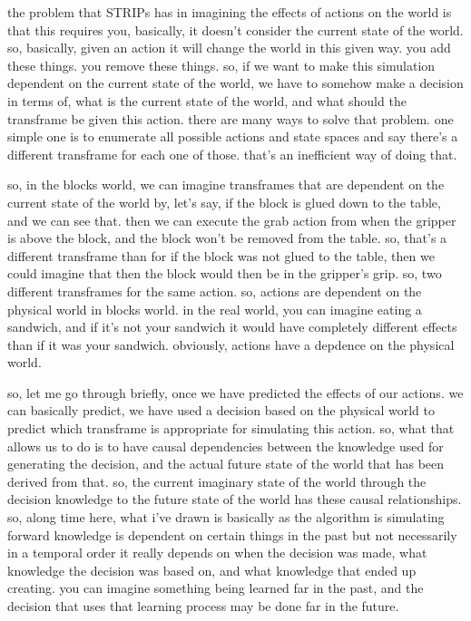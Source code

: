 the problem that STRIPs has in imagining the effects of actions on the world is that this requires you, basically, it doesn't consider the current state of the world.
so, basically, given an action it will change the world in this given way.
you add these things.
you remove these things.
so, if we want to make this simulation dependent on the current state of the world, we have to somehow make a decision in terms of, what is the current state of the world, and what should the transframe be given this action.
there are many ways to solve that problem.
one simple one is to enumerate all possible actions and state spaces and say there's a different transframe for each one of those.
that's an inefficient way of doing that.

so, in the blocks world, we can imagine transframes that are dependent on the current state of the world by,
let's say, if the block is glued down to the table, and we can see that.
then we can execute the grab action from when the gripper is above the block, and the block won't be removed from the table.
so, that's a different transframe than for if the block was not glued to the table, then we could imagine that then the block would then be in the gripper's grip.
so, two different transframes for the same action.
so, actions are dependent on the physical world in blocks world.
in the real world, you can imagine eating a sandwich, and if it's not your sandwich it would have completely different effects than if it was your sandwich.
obviously, actions have a depdence on the physical world.

so, let me go through briefly, once we have predicted the effects of our actions.
we can basically predict, we have used a decision based on the physical world to predict which transframe is appropriate for simulating this action.
so, what that allows us to do is to have causal dependencies between the knowledge used for generating the decision, and the actual future state of the world that has been derived from that.
so, the current imaginary state of the world through the decision knowledge to the future state of the world has these causal relationships.
so, along time here, what i've drawn is basically as the algorithm is simulating forward knowledge is dependent on certain things in the past but not necessarily in a temporal order it really depends on when the decision was made, what knowledge the decision was based on, and what knowledge that ended up creating.
you can imagine something being learned far in the past, and the decision that uses that learning process may be done far in the future.

